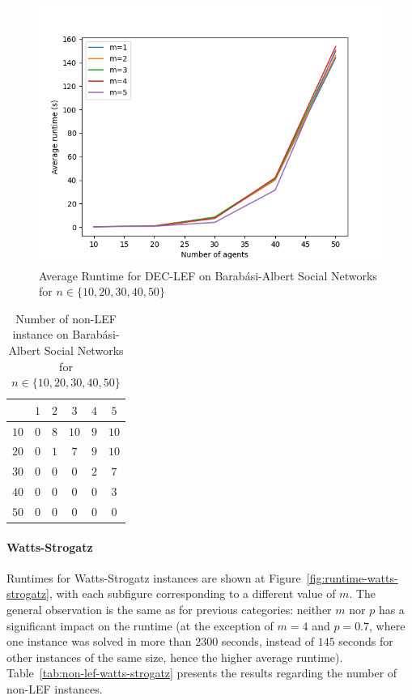 \documentclass{article}
\begin{document}
\begin{figure}[htb]
\centering
\includegraphics[width=0.45\linewidth]{results-runtime-BA.png}
\caption{Average Runtime for DEC-LEF on Barab\'asi-Albert Social Networks for $n \in \{10,20,30,40,50\}$\label{fig:runtime-barabasi-albert}}
\end{figure}

\begin{table}[htb]
\centering
\begin{tabular}{|c|c|c|c|c|c|}
	\hline
	\backslashbox{$n$}{$m$} & $1$ & $2$ & $3$ & $4$ & $5$ \\ \hline
	$10$ & $0$ & $8$ & $10$ & $9$ & $10$ \\
	$20$ & $0$ & $1$ & $7$ & $9$ & $10$ \\
	$30$ & $0$ & $0$ & $0$ & $2$ & $7$ \\
	$40$ & $0$ & $0$ & $0$ & $0$ & $3$ \\
	$50$ & $0$ & $0$ & $0$ & $0$ & $0$ \\
	\hline
\end{tabular}
\caption{Number of non-LEF instance on Barab\'asi-Albert Social Networks for $n \in \{10,20,30,40,50\}$\label{tab:non-lef-barabasi-albert}}
\end{table}

\paragraph{Watts-Strogatz} Runtimes for Watts-Strogatz instances are shown at Figure~\ref{fig:runtime-watts-strogatz}, with each subfigure corresponding to a different value of  $m $. The general observation is the same as for previous categories: neither $m$ nor $p$ has a significant impact on the runtime (at the exception of $m=4$ and $p=0.7$, where one instance was solved in more than $2300$ seconds, instead of $145$ seconds for other instances of the same size, hence the higher average runtime). Table~\ref{tab:non-lef-watts-strogatz} presents the results regarding the number of non-LEF instances.
\end{document}
